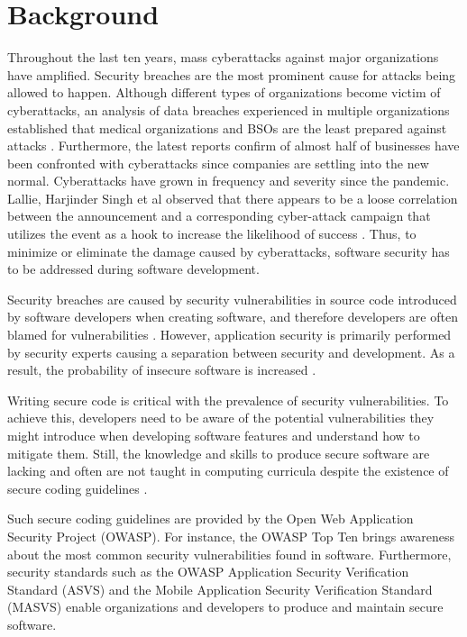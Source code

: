 \section{Background}
Throughout the last ten years, mass cyberattacks against major organizations have amplified. Security breaches are the most prominent cause for attacks being allowed to happen. Although different types of organizations become victim of cyberattacks, an analysis of data breaches experienced in multiple organizations established that medical organizations and BSOs are the least prepared against attacks \cite{Hammouchi_2019}. Furthermore, the latest reports confirm of almost half of businesses have been confronted with cyberattacks since companies are settling into the new normal. Cyberattacks have grown in frequency and severity since the pandemic. Lallie, Harjinder Singh et al observed that there appears to be a loose correlation between the announcement and a corresponding cyber-attack campaign that utilizes the event as a hook to increase the likelihood of success \cite{Lallie_2021}. Thus, to minimize or eliminate the damage caused by cyberattacks, software security has to be addressed during software development.

Security breaches are caused by security vulnerabilities in source code introduced by software developers when creating software, and therefore developers are often blamed for vulnerabilities \cite{Assal_2019}. However, application security is primarily performed by security experts causing a separation between security and development. As a result, the probability of insecure software is increased \cite{Thomas_2018}.

Writing secure code is critical with the prevalence of security vulnerabilities. To achieve this, developers need to be aware of the potential vulnerabilities they might introduce when developing software features and understand how to mitigate them. Still, the knowledge and skills to produce secure software are lacking and often are not taught in computing curricula despite the existence of secure coding guidelines \cite{Tabassum_2018} \cite{yu2011teaching} \cite{Espinha_Gasiba_2021}.

Such secure coding guidelines are provided by the Open Web Application Security Project (OWASP). For instance, the OWASP Top Ten brings awareness about the most common security vulnerabilities found in software. Furthermore, security standards such as the OWASP Application Security Verification Standard (ASVS) and the Mobile Application Security Verification Standard (MASVS) enable organizations and developers to produce and maintain secure software.


